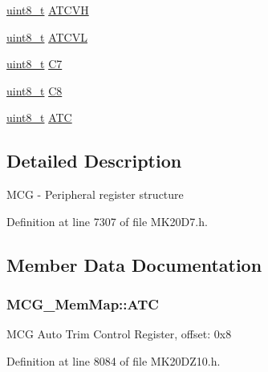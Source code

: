 \begin{DoxyCompactItemize}
\item 
\hyperlink{_p_e___types_8h_aba7bc1797add20fe3efdf37ced1182c5}{uint8\+\_\+t} \hyperlink{struct_m_c_g___mem_map_a74fee35955b4ec57aa8058bd57a926a8}{A\+T\+C\+VH}
\item 
\hyperlink{_p_e___types_8h_aba7bc1797add20fe3efdf37ced1182c5}{uint8\+\_\+t} \hyperlink{struct_m_c_g___mem_map_a913b6fd7776c0377e299fdf0eeb166af}{A\+T\+C\+VL}
\item 
\hyperlink{_p_e___types_8h_aba7bc1797add20fe3efdf37ced1182c5}{uint8\+\_\+t} \hyperlink{struct_m_c_g___mem_map_a7be430dafe8d0fddf4dbb83781946201}{C7}
\item 
\hyperlink{_p_e___types_8h_aba7bc1797add20fe3efdf37ced1182c5}{uint8\+\_\+t} \hyperlink{struct_m_c_g___mem_map_a346a8b8c5c2c675e6297aaa1f14798df}{C8}
\item 
\hyperlink{_p_e___types_8h_aba7bc1797add20fe3efdf37ced1182c5}{uint8\+\_\+t} \hyperlink{struct_m_c_g___mem_map_a5b3c88c7546109af0786b2639f80f6c4}{A\+TC}
\end{DoxyCompactItemize}


\subsection{Detailed Description}
M\+CG -\/ Peripheral register structure 

Definition at line 7307 of file M\+K20\+D7.\+h.



\subsection{Member Data Documentation}
\subsubsection[{\texorpdfstring{A\+TC}{ATC}}]{ M\+C\+G\+\_\+\+Mem\+Map\+::\+A\+TC}\hypertarget{struct_m_c_g___mem_map_a5b3c88c7546109af0786b2639f80f6c4}{}\label{struct_m_c_g___mem_map_a5b3c88c7546109af0786b2639f80f6c4}
M\+CG Auto Trim Control Register, offset\+: 0x8 

Definition at line 8084 of file M\+K20\+D\+Z10.\+h.

